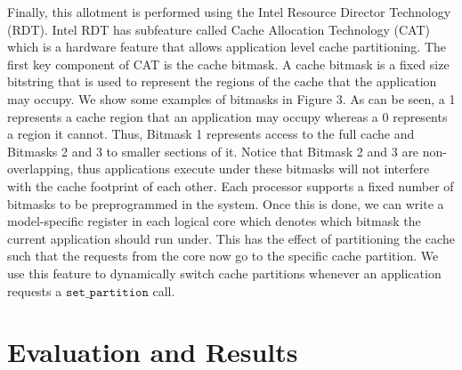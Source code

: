 \documentclass[sigconf,authorversion,noacm]{acmart}
\begin{document}
Finally, this allotment is performed using the Intel Resource Director
Technology (RDT). Intel RDT has subfeature called Cache Allocation Technology
(CAT) which is a hardware feature that allows application level cache
partitioning. The first key component of CAT is the cache bitmask. A cache
bitmask is a fixed size bitstring that is used to represent the regions of the
cache that the application may occupy. We show some examples of bitmasks in
Figure 3. As can be seen, a 1 represents a cache region that an application may
occupy whereas a 0 represents a region it cannot. Thus, Bitmask 1 represents
access to the full cache and Bitmasks 2 and 3 to smaller sections of it. Notice
that Bitmask 2 and 3 are non-overlapping, thus applications execute under these
bitmasks will not interfere with the cache footprint of each other. Each
processor supports a fixed number of bitmasks to be preprogrammed in the system.
Once this is done, we can write a model-specific register in each logical core
which denotes which bitmask the current application should run under. This has
the effect of partitioning the cache such that the requests from the core now go
to the specific cache partition. We use this feature to dynamically switch cache
partitions whenever an application requests a $\texttt{set\_partition}$ call.


\section{Evaluation and Results}
\end{document}
